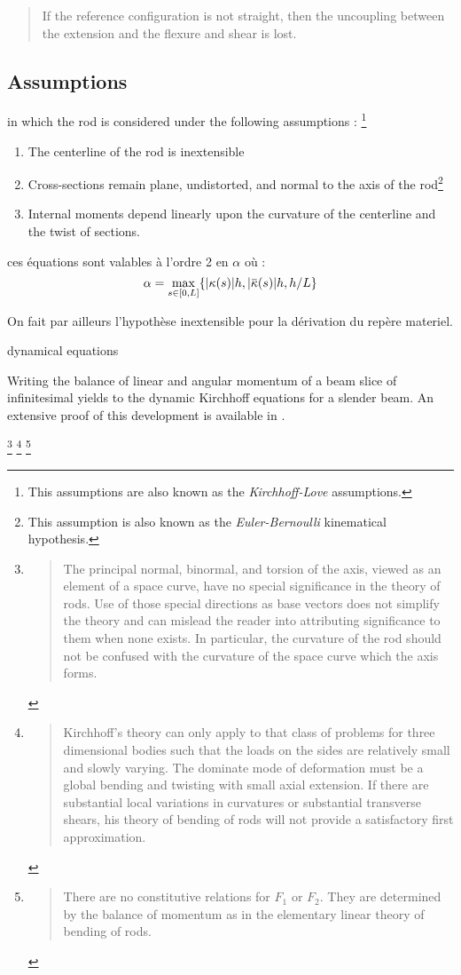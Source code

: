 \blockcquote[p.~341]{Antman2005}{If the reference configuration is not straight, then the uncoupling between the extension and the flexure and shear is lost.}



\subsection{Assumptions}

in which the rod is considered under the following assumptions : \footnote{This assumptions are also known as the \emph{Kirchhoff-Love} assumptions.}
\begin{enumerate}
\item The centerline of the rod is inextensible
\item Cross-sections remain plane, undistorted, and normal to the axis of the rod\footnote{This assumption is also known as the \emph{Euler-Bernoulli} kinematical hypothesis.}
\item Internal moments depend linearly upon the curvature of the centerline and the twist of sections.
\end{enumerate}



ces équations sont valables à l'ordre 2 en $\alpha$ où :
\begin{equation}
	\alpha = \max_{s \in [0,L]} \{ \abs{\kappa(s)} h, \abs{\overbar{\kappa}(s)} h, h/L\}
\end{equation}

On fait par ailleurs l'hypothèse inextensible pour la dérivation du repère materiel.

dynamical equations

Writing the balance of linear and angular momentum of a beam slice of infinitesimal yields to the dynamic Kirchhoff equations for a slender beam. An extensive proof of this development is available in \cite{Dill1992}.

\footnote{\blockcquote[p.~5]{Dill1992}{The principal normal, binormal, and torsion of the axis, viewed as an element of a space curve, have no special significance in the theory of rods. Use of those special directions as base vectors does not simplify the theory and can mislead the reader into attributing significance to them when none exists. In particular, the curvature of the rod should not be confused with the curvature of the space curve which the axis forms.}}
\footnote{\blockcquote[p.~18]{Dill1992}{Kirchhoff's theory can only apply to that class of problems for three dimensional bodies such that the loads on the sides are relatively small and slowly varying. The dominate mode of deformation must be a global bending and twisting with small axial extension. If there are substantial local variations in curvatures or substantial transverse shears, his theory of bending of rods will not provide a satisfactory first approximation.}}
\footnote{\blockcquote[p.~15]{Dill1992}{There are no constitutive relations for $F_1$ or $F_2$. They are determined by the balance of momentum as in the elementary linear theory of bending of rods.}}

